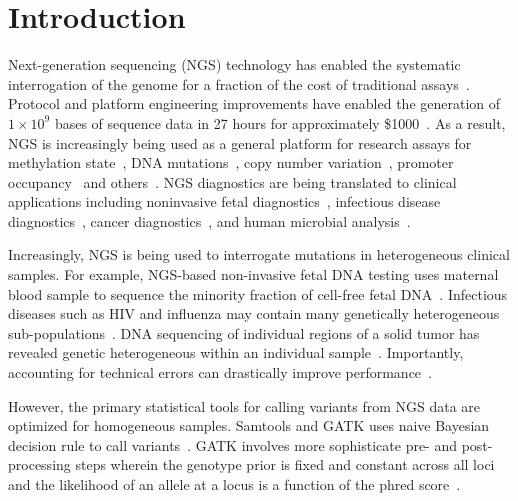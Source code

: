 \documentclass{bioinfo}
\begin{document}
\section{Introduction}
\label{sec:intro}
Next-generation sequencing (NGS) technology has enabled the systematic interrogation of the genome for a fraction of the cost of traditional assays~\citep{Koboldt:2013kw}. Protocol and platform engineering improvements have enabled the generation of $1\times10^9$ bases of sequence data in 27 hours for approximately \$1000~\citep{Quail:2012hf}. As a result, NGS is increasingly being used as a general platform for research assays for methylation state~\citep{Laird:2010ab}, DNA mutations~\citep{Consortium:2013co}, copy number variation~\citep{Alkan:2009cr}, promoter occupancy~\citep{Ouyang:2009hc} and others~\citep{Rivera:2013ee}. NGS diagnostics are being translated to clinical applications including noninvasive fetal diagnostics~\citep{Kitzman:2012hea}, infectious disease diagnostics~\citep{Capobianchi:2012em}, cancer diagnostics~\citep{Navin:2010gu}, and human microbial analysis~\citep{Consortium:2013iz}.

Increasingly, NGS is being used to interrogate mutations in heterogeneous clinical samples. For example, NGS-based non-invasive fetal DNA testing uses maternal blood sample to sequence the minority fraction of cell-free fetal DNA~\citep{Fan:2008di}. Infectious diseases such as HIV and influenza may contain many genetically heterogeneous sub-populations~\citep{Flaherty:2011ja, Ghedin:2010ie}. DNA sequencing of individual regions of a solid tumor has revealed genetic heterogeneous within an individual sample~\citep{Navin:2010gu}. Importantly, accounting for technical errors can drastically improve performance~\citep{zagordi2010error}.

However, the primary statistical tools for calling variants from NGS data are optimized for homogeneous samples. Samtools and GATK uses naive Bayesian decision rule to call variants~\citep{li2011statistical, depristo2011framework}. GATK involves more sophisticate pre- and post-processing steps wherein the genotype prior is fixed and constant across all loci and the likelihood of an allele at a locus is a function of the phred score~\citep{McKenna:2010bv}.
\end{document}
